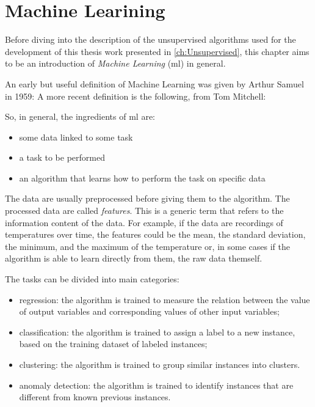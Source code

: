 \chapter{Machine Learining}
\label{ch:MachineLearning}

Before diving into the description of the unsupervised algorithms used for the development of this thesis work presented in \autoref{ch:Unsupervised}, this chapter aims to be an introduction of \emph{Machine Learning} (\gls{ml}) in general.

An early but useful definition of Machine Learning was given by Arthur Samuel in 1959:  A more recent definition is the following, from Tom Mitchell:  

So, in general, the ingredients of \gls{ml} are:
\begin{itemize}
    \item some data linked to some task
    \item a task to be performed
    \item an algorithm that learns how to perform the task on specific data
\end{itemize}

The data are usually preprocessed before giving them to the algorithm. The processed data are called \emph{features}. This is a generic term that refers to the information content of the data.
For example, if the data are recordings of temperatures over time, the features could be the mean, the standard deviation, the minimum, and the maximum of the temperature or, in some cases if the algorithm is able to learn directly from them, the raw data themself.

The tasks can be divided into main categories:
\begin{itemize}
    \item regression: the algorithm is trained to measure the relation between the value of output variables and corresponding values of other input variables;
    \item classification: the algorithm is trained to assign a label to a new instance, based on the training dataset of labeled instances;
    \item clustering: the algorithm is trained to group similar instances into clusters.
    \item anomaly detection: the algorithm is trained to identify instances that are different from known previous instances.
\end{itemize}

